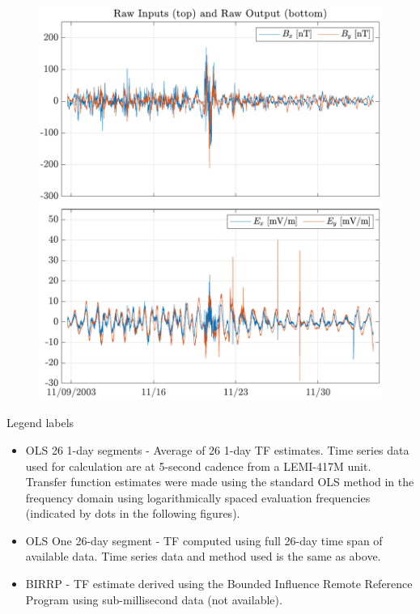 \documentclass{article}
\begin{document}
\begin{figure}[h!]
\centering
\includegraphics[width=\textwidth]{figures/KAP103/timeseries.pdf}
\caption{}
\label{fig:KAP103_timeseries}
\end{figure}

Legend labels

\begin{itemize}

    \item OLS 26 1-day segments - Average of 26 1-day TF estimates. Time series data used for calculation are at 5-second cadence from a LEMI-417M unit. Transfer function estimates were made using the standard OLS method in the frequency domain using logarithmically spaced evaluation frequencies (indicated by dots in the following figures).

    \item OLS One 26-day segment - TF computed using full 26-day time span of available data. Time series data and method used is the same as above.

    \item BIRRP - TF estimate derived using the Bounded Influence Remote Reference Program using sub-millisecond data (not available).

\end{itemize}
\end{document}
